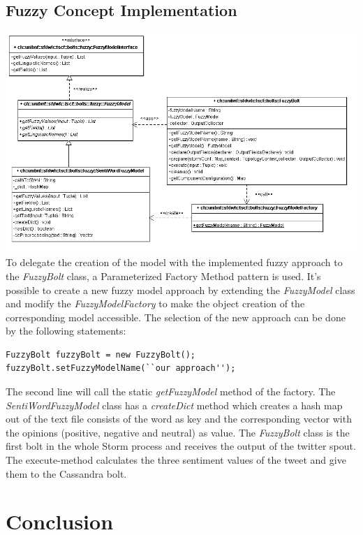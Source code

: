 \documentclass[a4paper]{article}
\begin{document}
\subsection{Fuzzy Concept Implementation}
\includegraphics[scale=0.5]{images/FuzzyModelFactory_Diagram.png}\\
To delegate the creation of the model with the implemented fuzzy approach to the \textit{FuzzyBolt} class, a Parameterized Factory Method pattern is used. It's possible to create a new fuzzy model approach by extending the \textit{FuzzyModel} class and modify the \textit{FuzzyModelFactory} to make the object creation of the corresponding model accessible. The selection of the new approach can be done by the following statements:
\lstset{language=Java}
\begin{lstlisting}
FuzzyBolt fuzzyBolt = new FuzzyBolt();
fuzzyBolt.setFuzzyModelName(``our approach'');
\end{lstlisting}
The second line will call the static \textit{getFuzzyModel} method of the factory.
The \textit{SentiWordFuzzyModel} class has a \textit{createDict} method which creates a hash map out of the text file consists of the word as key and the corresponding vector with the opinions (positive, negative and neutral) as value.
The \textit{FuzzyBolt} class is the first bolt in the whole Storm process and receives the output of the twitter spout. The execute-method calculates the three sentiment values of the tweet and give them to the Cassandra bolt.

\section{Conclusion}

\newpage
\end{document}
